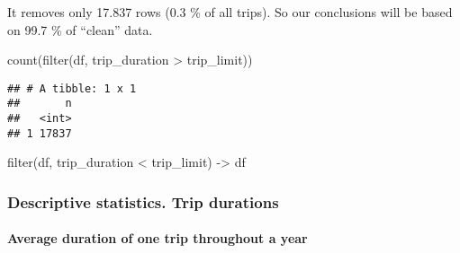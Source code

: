 \documentclass[
]{article}
\newenvironment{Shaded}{\begin{snugshade}}{\end{snugshade}}
\newcommand{\FunctionTok}[1]{\textcolor[rgb]{0.00,0.00,0.00}{#1}}
\newcommand{\NormalTok}[1]{#1}
\newcommand{\OtherTok}[1]{\textcolor[rgb]{0.56,0.35,0.01}{#1}}
\newcommand{\SpecialCharTok}[1]{\textcolor[rgb]{0.00,0.00,0.00}{#1}}
\begin{document}
It removes only 17.837 rows (0.3 \% of all trips). So our conclusions
will be based on 99.7 \% of ``clean'' data.

\begin{Shaded}
\begin{Highlighting}[]
\FunctionTok{count}\NormalTok{(}\FunctionTok{filter}\NormalTok{(df, trip\_duration }\SpecialCharTok{\textgreater{}}\NormalTok{ trip\_limit))}
\end{Highlighting}
\end{Shaded}

\begin{verbatim}
## # A tibble: 1 x 1
##       n
##   <int>
## 1 17837
\end{verbatim}

\begin{Shaded}
\begin{Highlighting}[]
\FunctionTok{filter}\NormalTok{(df, trip\_duration }\SpecialCharTok{\textless{}}\NormalTok{ trip\_limit) }\OtherTok{{-}\textgreater{}}\NormalTok{ df}
\end{Highlighting}
\end{Shaded}

\hypertarget{descriptive-statistics.-trip-durations}{%
\subsubsection{Descriptive statistics. Trip
durations}\label{descriptive-statistics.-trip-durations}}

\hypertarget{average-duration-of-one-trip-throughout-a-year}{%
\paragraph{Average duration of one trip throughout a
year}\label{average-duration-of-one-trip-throughout-a-year}}
\end{document}
